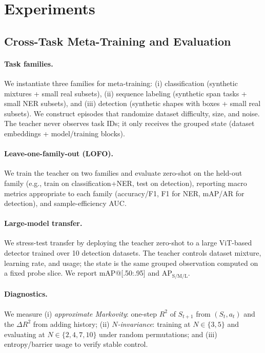 \documentclass[11pt]{article}
\newcommand{\1}{\mathbf{1}}
\begin{document}
\section{Experiments}
\subsection{Cross-Task Meta-Training and Evaluation}
\paragraph{Task families.}
We instantiate three families for meta-training: (i) classification (synthetic mixtures + small real subsets), (ii) sequence labeling (synthetic span tasks + small NER subsets), and (iii) detection (synthetic shapes with boxes + small real subsets). 
We construct episodes that randomize dataset difficulty, size, and noise. 
The teacher never observes task IDs; it only receives the grouped state (dataset embeddings + model/training blocks).

\paragraph{Leave-one-family-out (LOFO).}
We train the teacher on two families and evaluate zero-shot on the held-out family (e.g., train on classification+NER, test on detection), reporting macro metrics appropriate to each family (accuracy/F1, F1 for NER, mAP/AR for detection), and sample-efficiency AUC.

\paragraph{Large-model transfer.}
We stress-test transfer by deploying the teacher zero-shot to a large ViT-based detector trained over 10 detection datasets. 
The teacher controls dataset mixture, learning rate, and usage; the state is the same grouped observation computed on a fixed probe slice.
We report mAP@[.50:.95] and AP$_\mathrm{S/M/L}$.

\paragraph{Diagnostics.}
We measure (i) \emph{approximate Markovity}: one-step $R^2$ of $S_{t+1}$ from $(S_t,a_t)$ and the $\Delta R^2$ from adding history; (ii) \emph{$N$-invariance}: training at $N\in\{3,5\}$ and evaluating at $N\in\{2,4,7,10\}$ under random permutations; and (iii) entropy/barrier usage to verify stable control.
\end{document}
